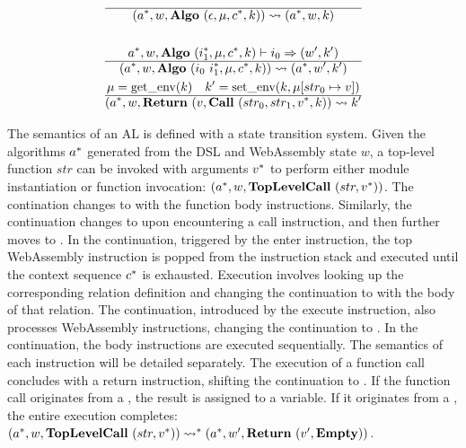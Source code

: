 \begin{gather*}
%
\newline \\
  \hline
  (\seq{a}, w, \algo ~ (\epsilon, \mu, \seq c, k)) \leadsto (\seq{a}, w, k) \\
%
\newline \\
  \seq{a}, w, \algo ~ (\seq{i_1}, \mu, \seq c, k) \vdash i_0 \Rightarrow (w', k') \\
  \hline
  (\seq{a}, w, \algo ~ (i_0 ~ \seq{i_1}, \mu, \seq c, k)) \leadsto (\seq{a}, w', k') \\
%
  \mu = \getenv(k) \quad k' = \setenv(k, \mu[str_0 \mapsto v]) \\
  \hline
  (\seq{a}, w, \ret ~ (v, \call ~ (str_0, str_1, \seq v, k)) \leadsto k' \\
\end{gather*}

The semantics of an AL is defined with a state transition system.
Given the algorithms $a^*$ generated from the DSL and WebAssembly state $w$,
a top-level function $str$ can be invoked with arguments $v^*$ to perform
either module instantiation or function invocation:
$(a^*, w, \textbf{TopLevelCall} ~ (str, v^*))$.
The contination changes to \algo{} with the function body instructions.
Similarly, the continuation changes to \call{} upon encountering a call
instruction, and then further moves to \algo{}.
In the \wasm{} continuation, triggered by the enter instruction, the top
WebAssembly instruction is popped from the instruction stack and executed
until the context sequence $c^*$ is exhausted.
Execution involves looking up the corresponding relation definition and
changing the continuation to \algo{} with the body of that relation.
The \execute{} continuation, introduced by the execute instruction, also
processes WebAssembly instructions, changing the continuation to \algo{}.
In the \algo{} continuation, the body instructions are executed sequentially.
The semantics of each instruction will be detailed separately.
The execution of a function call concludes with a return instruction, shifting
the continuation to \ret{}.
If the function call originates from a \call{}, the result is assigned to a
variable.
If it originates from a \toplevelcall{}, the entire execution completes:
$
(a^*, w, \textbf{TopLevelCall} ~ (str, v^*))
\leadsto^*
(a^*, w', \textbf{Return} ~ (v', \textbf{Empty}))
$.



